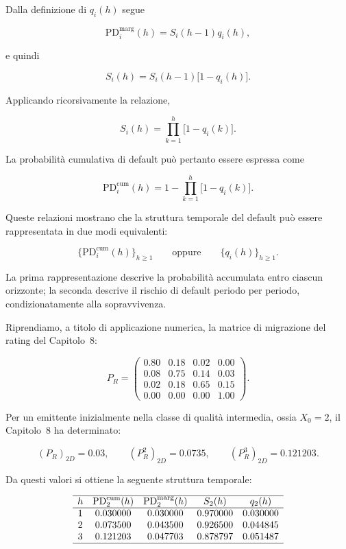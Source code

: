 Dalla definizione di $q_i(h)$ segue

\[
\mathrm{PD}_{i}^{\mathrm{marg}}(h)
=
S_i(h-1)q_i(h),
\]

e quindi

\[
S_i(h)
=
S_i(h-1)\bigl[1-q_i(h)\bigr].
\]

Applicando ricorsivamente la relazione,

\[
S_i(h)
=
\prod_{k=1}^{h}
\bigl[1-q_i(k)\bigr].
\]

La probabilit\`{a} cumulativa di default pu\`{o} pertanto essere
espressa come

\[
\mathrm{PD}_{i}^{\mathrm{cum}}(h)
=
1-
\prod_{k=1}^{h}
\bigl[1-q_i(k)\bigr].
\]

Queste relazioni mostrano che la struttura temporale del default
pu\`{o} essere rappresentata in due modi equivalenti:

\[
\{
\mathrm{PD}_{i}^{\mathrm{cum}}(h)
\}_{h\geq 1}
\qquad\text{oppure}\qquad
\{
q_i(h)
\}_{h\geq 1}.
\]

La prima rappresentazione descrive la probabilit\`{a} accumulata entro
ciascun orizzonte; la seconda descrive il rischio di default periodo
per periodo, condizionatamente alla sopravvivenza.

Riprendiamo, a titolo di applicazione numerica, la matrice di
migrazione del rating del Capitolo~8:

\[
P_R
=
\begin{pmatrix}
0.80 & 0.18 & 0.02 & 0.00\\
0.08 & 0.75 & 0.14 & 0.03\\
0.02 & 0.18 & 0.65 & 0.15\\
0.00 & 0.00 & 0.00 & 1.00
\end{pmatrix}.
\]

Per un emittente inizialmente nella classe di qualit\`{a} intermedia,
ossia $X_0=2$, il Capitolo~8 ha determinato:

\[
(P_R)_{2D}=0.03,
\qquad
(P_R^2)_{2D}=0.0735,
\qquad
(P_R^3)_{2D}=0.121203.
\]

Da questi valori si ottiene la seguente struttura temporale:

\[
\begin{array}{ccccc}
\hline
h
&
\mathrm{PD}_{2}^{\mathrm{cum}}(h)
&
\mathrm{PD}_{2}^{\mathrm{marg}}(h)
&
S_2(h)
&
q_2(h)
\\
\hline
1
&
0.030000
&
0.030000
&
0.970000
&
0.030000
\\
2
&
0.073500
&
0.043500
&
0.926500
&
0.044845
\\
3
&
0.121203
&
0.047703
&
0.878797
&
0.051487
\\
\hline
\end{array}
\]

